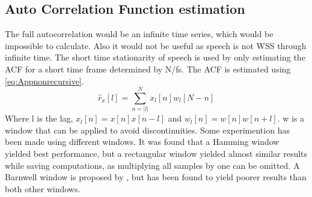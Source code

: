 \subsection{Auto Correlation Function estimation}
The full autocorrelation would be an infinite time series, which would be impossible to calculate. Also it would not be useful as speech is not WSS through infinite time. The short time stationarity of speech is used by only estimating the ACF for a short time frame determined by N/fs. The ACF is estimated using \autoref{eq:Appnonrecursive}.
\begin{equation}\label{eq:Appnonrecursive}
\hat{r}_x[l] = \sum^{N}_{n=\left| l\right|} x_l[n]w_l[N-n]
\end{equation}
Where l is the lag, $x_l[n]=x[n]x[n-l]$ and $w_l[n]=w[n]w[n+l]$. w is a window that can be applied to avoid discontinuities. Some experimention has been made using different windows. It was found that a Hamming window yielded best performance, but a rectangular window yielded almost similar results while saving computations, as multiplying all samples by one can be omitted. A Barnwell window is proposed by \cite{Speech}, but has been found to yield poorer results than both other windows.   

